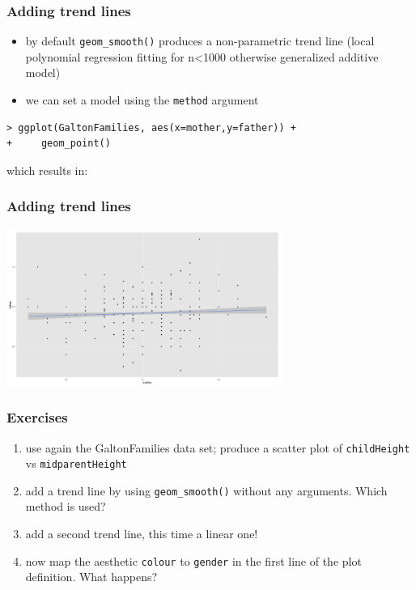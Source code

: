 \documentclass[xcolor={table}]{beamer}
\begin{document}
\begin{frame}[fragile]\frametitle{Adding trend lines}
  \begin{itemize}
  \item by default \texttt{geom\_smooth()} produces a non-parametric trend line (local polynomial regression fitting for n<1000 otherwise generalized additive model)
  \item we can set a model using the \texttt{method} argument
  \end{itemize}\small
\begin{verbatim}
> ggplot(GaltonFamilies, aes(x=mother,y=father)) +
+     geom_point()
\end{verbatim}
which results in:
\end{frame}


\begin{frame}\frametitle{Adding trend lines}
  \begin{center}
    \includegraphics[width=9cm]{scattertrend2.png}
  \end{center}
\end{frame}


\begin{frame}[allowframebreaks]\frametitle{Exercises}
  \begin{enumerate}
  \item use again the GaltonFamilies data set; produce a scatter plot of \texttt{childHeight} vs \texttt{midparentHeight}
  \item add a trend line by using \texttt{geom\_smooth()} without any arguments. Which method is used?
  \item add a second trend line, this time a linear one!
  \item now map the aesthetic \texttt{colour} to \texttt{gender} in the first line of the plot definition. What happens?
  \end{enumerate}
\end{frame}
\end{document}
